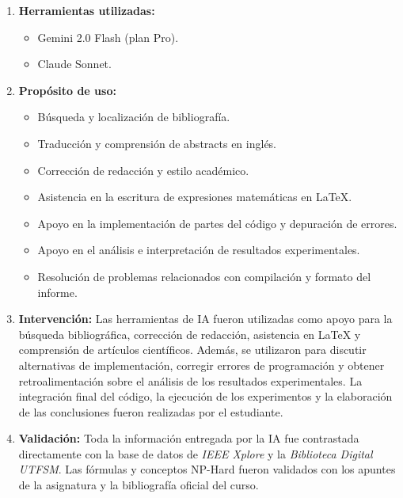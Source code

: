 \documentclass[letter, 10pt]{article}
\begin{document}
\begin{enumerate}
\item \textbf{Herramientas utilizadas:}
\begin{itemize}
\item Gemini 2.0 Flash (plan Pro).
\item Claude Sonnet.
\end{itemize}

\item \textbf{Prop\'osito de uso:}
\begin{itemize}
\item B\'usqueda y localizaci\'on de bibliograf\'ia.
\item Traducci\'on y comprensi\'on de abstracts en ingl\'es.
\item Correcci\'on de redacci\'on y estilo acad\'emico.
\item Asistencia en la escritura de expresiones matem\'aticas en LaTeX.
\item Apoyo en la implementaci\'on de partes del c\'odigo y depuraci\'on de errores.
\item Apoyo en el an\'alisis e interpretaci\'on de resultados experimentales.
\item Resoluci\'on de problemas relacionados con compilaci\'on y formato del informe.
\end{itemize}

\item \textbf{Intervenci\'on:}
Las herramientas de IA fueron utilizadas como apoyo para la b\'usqueda bibliogr\'afica, correcci\'on de redacci\'on, asistencia en LaTeX y comprensi\'on de art\'iculos cient\'ificos. Adem\'as, se utilizaron para discutir alternativas de implementaci\'on, corregir errores de programaci\'on y obtener retroalimentaci\'on sobre el an\'alisis de los resultados experimentales. La integraci\'on final del c\'odigo, la ejecuci\'on de los experimentos y la elaboraci\'on de las conclusiones fueron realizadas por el estudiante.
\item \textbf{Validaci\'on:} Toda la informaci\'on entregada por la IA fue contrastada directamente con la base de datos de \textit{IEEE Xplore} y la \textit{Biblioteca Digital UTFSM}. Las f\'ormulas y conceptos NP-Hard fueron validados con los apuntes de la asignatura y la bibliograf\'ia oficial del curso.
\end{enumerate}



\end{document}
